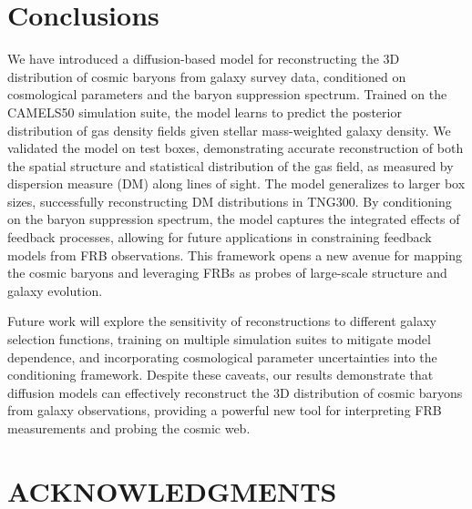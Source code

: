 \documentclass[twocolumn]{aastex631}
\begin{document}
\section{Conclusions}
\label{sec:conclusion}
We have introduced a diffusion-based model for reconstructing the 3D distribution of cosmic baryons from galaxy survey data, conditioned on cosmological parameters and the baryon suppression spectrum. Trained on the CAMELS50 simulation suite, the model learns to predict the posterior distribution of gas density fields given stellar mass-weighted galaxy density. We validated the model on test boxes, demonstrating accurate reconstruction of both the spatial structure and statistical distribution of the gas field, as measured by dispersion measure (DM) along lines of sight. The model generalizes to larger box sizes, successfully reconstructing DM distributions in TNG300. By conditioning on the baryon suppression spectrum, the model captures the integrated effects of feedback processes, allowing for future applications in constraining feedback models from FRB observations. This framework opens a new avenue for mapping the cosmic baryons and leveraging FRBs as probes of large-scale structure and galaxy evolution.

Future work will explore the sensitivity of reconstructions to different galaxy selection functions, training on multiple simulation suites to mitigate model dependence, and incorporating cosmological parameter uncertainties into the conditioning framework. Despite these caveats, our results demonstrate that diffusion models can effectively reconstruct the 3D distribution of cosmic baryons from galaxy observations, providing a powerful new tool for interpreting FRB measurements and probing the cosmic web.

\section{ACKNOWLEDGMENTS}

\clearpage


\end{document}

